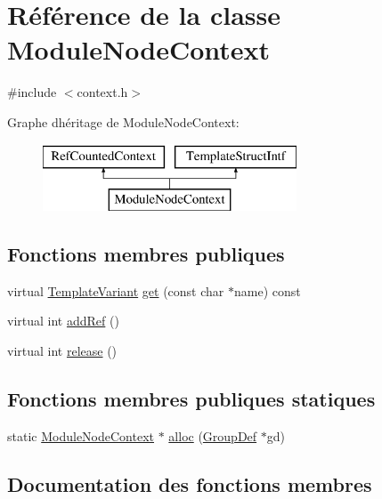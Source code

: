 \hypertarget{class_module_node_context}{}\section{Référence de la classe Module\+Node\+Context}
\label{class_module_node_context}


{\ttfamily \#include $<$context.\+h$>$}

Graphe d\textquotesingle{}héritage de Module\+Node\+Context\+:\begin{figure}[H]
\begin{center}
\leavevmode
\includegraphics[height=2.000000cm]{class_module_node_context}
\end{center}
\end{figure}
\subsection*{Fonctions membres publiques}
\begin{DoxyCompactItemize}
\item 
virtual \hyperlink{class_template_variant}{Template\+Variant} \hyperlink{class_module_node_context_a3f92b27317e449a8433cf1dd1393cff6}{get} (const char $\ast$name) const 
\item 
virtual int \hyperlink{class_module_node_context_a284f34df0eaa975c777de7ccba4a80eb}{add\+Ref} ()
\item 
virtual int \hyperlink{class_module_node_context_adbd3a06adc44c46a8124fc61634dd0c5}{release} ()
\end{DoxyCompactItemize}
\subsection*{Fonctions membres publiques statiques}
\begin{DoxyCompactItemize}
\item 
static \hyperlink{class_module_node_context}{Module\+Node\+Context} $\ast$ \hyperlink{class_module_node_context_a134aa51eb6f16c13a0b1c3e0a2691cc9}{alloc} (\hyperlink{class_group_def}{Group\+Def} $\ast$gd)
\end{DoxyCompactItemize}


\subsection{Documentation des fonctions membres}
\hypertarget{class_module_node_context_a284f34df0eaa975c777de7ccba4a80eb}{}
